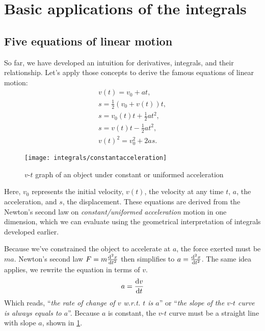 \section{Basic applications of the integrals}

\subsection{Five equations of linear motion}
\label{sec:fiveequationsoflinearmotion}

So far, we have developed an intuition for derivatives, integrals, and their relationship. Let's apply those concepts to derive the famous equations of linear motion:
\begin{gather}
    v(t) = v_0 + at, \label{eq:linearmotion1}\\
    s = \frac{1}{2}(v_0 + v(t))t, \label{eq:linearmotion2}\\
    s = v_0(t)t + \frac{1}{2}at^2, \label{eq:linearmotion3}\\
    s = v(t)t - \frac{1}{2}at^2,\label{eq:linearmotion4}\\
    v(t)^2 = v_0^2 + 2as. \label{eq:linearmotion5}
\end{gather}

\begin{figure}[b]
    \centering
    \texttt{[image: integrals/constantacceleration]}
    \caption{$v$-$t$ graph of an object under constant or uniformed acceleration}
    \label{fig:vtconstantacceleration}
\end{figure}
Here, $v_0$ represents the initial velocity, $v(t)$, the velocity at any time $t$, $a$, the acceleration, and $s$, the displacement. These equations are derived from the Newton's second law on \emph{constant/uniformed acceleration} motion in one dimension, which we can evaluate using the geometrical interpretation of integrals developed earlier.

Because we've constrained the object to accelerate at $a$, the force exerted must be $ma$. Newton's second law $F = m\odv[ord = 2]{x}{t}$ then simplifies to $a = \odv[ord = 2]{x}{t}$. The same idea applies, we rewrite the equation in terms of $v$.
\begin{equation}
    a = \odv{v}{t} \label{eq:linearmotionintermediate}
\end{equation}
Which reads, ``\emph{the rate of change of $v$ w.r.t. $t$ is $a$}'' or ``\emph{the slope of the $v$-$t$ curve is always equals to $a$}''. Because $a$ is constant, the $v$-$t$ curve must be a straight line with slope $a$, shown in \cref{fig:vtconstantacceleration}.

